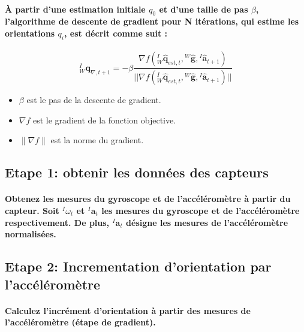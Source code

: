 \paragraph{À partir d'une estimation initiale $q_0$ et d'une taille de pas $\beta$, l'algorithme de descente de gradient pour N itérations, qui estime les orientations $q_i$, est décrit comme suit :}

\begin{equation}
	{}^{I}_{W}\mathbf{q}_{\nabla, t+1} = - \beta\frac{\nabla f\left( {}^{I}_{W}\mathbf{\hat{q}}_{est, t}, {}^{W}\mathbf{\hat{g}}, {}^{I}\mathbf{\hat{a}}_{t+1} \right)}{\vert \vert  \nabla f\left( {}^{I}_{W}\mathbf{\hat{q}}_{est, t}, {}^{W}\mathbf{\hat{g}}, {}^{I}\mathbf{\hat{a}}_{t+1} \right) \vert \vert}\end{equation}


\begin{itemize}
	\item $\beta$ est le pas de la descente de gradient.
	\item $\nabla f$ est le gradient de la fonction objective.
	\item $\|\nabla f\|$ est la norme du gradient.
\end{itemize}

\subsection{Etape 1: obtenir les données des capteurs}

\paragraph{Obtenez les mesures du gyroscope et de l'accéléromètre à partir du capteur. Soit ${}^I\omega_t$ et ${}^I\mathbf{a}_t$ les mesures du gyroscope et de l'accéléromètre respectivement. De plus, ${}^I\mathbf{a}_t$ désigne les mesures de l'accéléromètre normalisées.}

\subsection{Etape 2: Incrementation d'orientation par l'accéléromètre}

\paragraph{Calculez l'incrément d'orientation à partir des mesures de l'accéléromètre (étape de gradient).}

